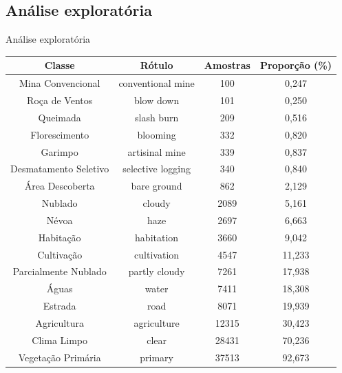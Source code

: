 \documentclass{beamer}
\begin{document}
\subsection{Análise exploratória}
\begin{frame}{Análise exploratória}
    \fontsize{9pt}{10pt}\selectfont
    \begin{tabular}{*{4}{c}}
        \hline
        Classe                  &            Rótulo &  Amostras      &  Proporção (\%) \\
        \hline
        Mina Convencional       & conventional mine &        100     &       0,247 \\
        Roça de Ventos          &         blow down &        101     &       0,250 \\
        Queimada                &        slash burn &        209     &       0,516 \\
        Florescimento           &          blooming &        332     &       0,820 \\
        Garimpo                 &    artisinal mine &        339     &       0,837 \\
        Desmatamento Seletivo   & selective logging &        340     &       0,840 \\
        Área Descoberta         &       bare ground &        862     &       2,129 \\
        Nublado                 &            cloudy &       2089     &       5,161 \\
        Névoa                   &              haze &       2697     &       6,663 \\
        Habitação               &        habitation &       3660     &       9,042 \\
        Cultivação              &       cultivation &       4547     &      11,233 \\
        Parcialmente Nublado    &     partly cloudy &       7261     &      17,938 \\
        Águas                   &             water &       7411     &      18,308 \\
        Estrada                 &              road &       8071     &      19,939 \\
        Agricultura             &       agriculture &      12315     &      30,423 \\
        Clima Limpo             &             clear &      28431     &      70,236 \\
        Vegetação Primária      &           primary &      37513     &      92,673 \\
        \hline
    \end{tabular}
  
\end{frame}
\end{document}
